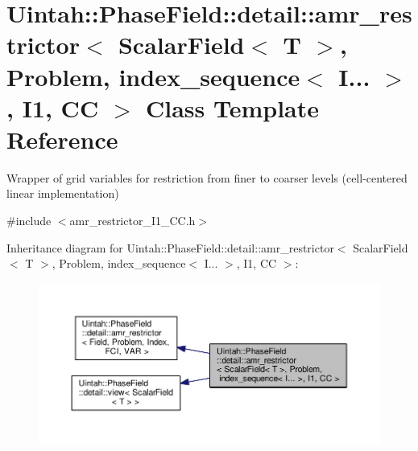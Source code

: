 \hypertarget{classUintah_1_1PhaseField_1_1detail_1_1amr__restrictor_3_01ScalarField_3_01T_01_4_00_01Problem_0778720acc9a55f696b8537356a4dbcae}{}\section{Uintah\+:\+:Phase\+Field\+:\+:detail\+:\+:amr\+\_\+restrictor$<$ Scalar\+Field$<$ T $>$, Problem, index\+\_\+sequence$<$ I... $>$, I1, CC $>$ Class Template Reference}
\label{classUintah_1_1PhaseField_1_1detail_1_1amr__restrictor_3_01ScalarField_3_01T_01_4_00_01Problem_0778720acc9a55f696b8537356a4dbcae}


Wrapper of grid variables for restriction from finer to coarser levels (cell-\/centered linear implementation)  




{\ttfamily \#include $<$amr\+\_\+restrictor\+\_\+\+I1\+\_\+\+C\+C.\+h$>$}



Inheritance diagram for Uintah\+:\+:Phase\+Field\+:\+:detail\+:\+:amr\+\_\+restrictor$<$ Scalar\+Field$<$ T $>$, Problem, index\+\_\+sequence$<$ I... $>$, I1, CC $>$\+:\nopagebreak
\begin{figure}[H]
\begin{center}
\leavevmode
\includegraphics[width=350pt]{classUintah_1_1PhaseField_1_1detail_1_1amr__restrictor_3_01ScalarField_3_01T_01_4_00_01Problem_04093513e287bc124f53e03ea6f74dce7}
\end{center}
\end{figure}


